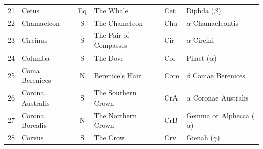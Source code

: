 \documentclass[a4paper,12pt]{extarticle}
\begin{document}
\begin{table}[H]
\begin{tabular}{llclll}
21                                                                              & Cetus                                         & Eq                                       & The Whale                                       & Cet                                                                              & Diphda  ($\beta$)                              \\
22                                                                              & Chamaeleon                                    & S                                        & The Chameleon                                   & Cha                                                                              & $\alpha$ Chamaeleontis                         \\
23                                                                              & Circinus                                      & S                                        & The Pair of Compasses                           & Cir                                                                              & $\alpha$ Circini                               \\
24                                                                              & Columba                                       & S                                        & The Dove                                        & Col                                                                              & Phact ($\alpha$)                \\
25                                                                              & Coma Berenices                                & N                                        & Berenice’s Hair                                 & Com                                                                              & $\beta$ Comae Berenices                        \\
26                                                                              & Corona Australis                              & S                                        & The Southern Crown                              & CrA                                                                              & $\alpha$ Coronae Australis     \\
27 & Corona Borealis & N    & The Northern Crown     & CrB & Gemma or Alphecca ($\alpha$)       \\
28 & Corvus          & S    & The Crow               & Crv & Gienah ($\gamma$)                  \\

\end{tabular}
\end{table}
\end{document}
